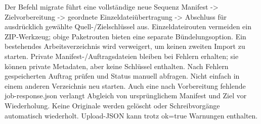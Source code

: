 \documentclass[11pt,a4paper]{article}
\begin{document}
Der Befehl migrate führt eine vollständige neue Sequenz Manifest -> Zielvorbereitung ->
geordnete Einzeldateiübertragung -> Abschluss für ausdrücklich gewählte Quell-/Zielschlüssel
aus. Einzeldateirouten vermeiden ein ZIP-Werkzeug; obige Paketrouten bieten eine separate
Bündelungsoption. Ein bestehendes Arbeitsverzeichnis wird verweigert, um keinen zweiten
Import zu starten. Private Manifest-/Auftragsdateien bleiben bei Fehlern erhalten; sie
können private Metadaten, aber keine Schlüssel enthalten. Nach Fehlern gespeicherten Auftrag
prüfen und Status manuell abfragen. Nicht einfach in einem anderen Verzeichnis neu starten.
Auch eine nach Vorbereitung fehlende job-response.json verlangt Abgleich von ursprünglichem
Manifest und Ziel vor Wiederholung. Keine Originale werden gelöscht oder Schreibvorgänge
automatisch wiederholt. Upload-JSON kann trotz ok=true Warnungen enthalten.
\end{document}
